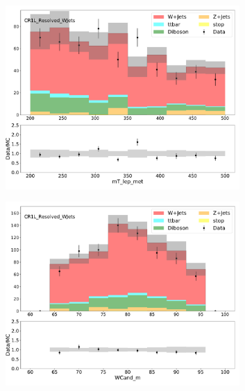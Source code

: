 \begin{figure}[htbp]
  \centering
     \begin{subfigure}{0.49\textwidth}
     \includegraphics[width = 0.98\textwidth]{Figures/4/datamc/CR1L_Resolved_WJets/mT_lep_met.pdf}
     \caption{\mtlepmet}
     \end{subfigure}
     \begin{subfigure}{0.49\textwidth}
     \includegraphics[width = 0.98\textwidth]{Figures/4/datamc/CR1L_Resolved_WJets/WCand_m.pdf}
     \caption{\Wcandm}
     \end{subfigure}
     \begin{subfigure}{0.49\textwidth}

\end{subfigure}
\end{figure}

